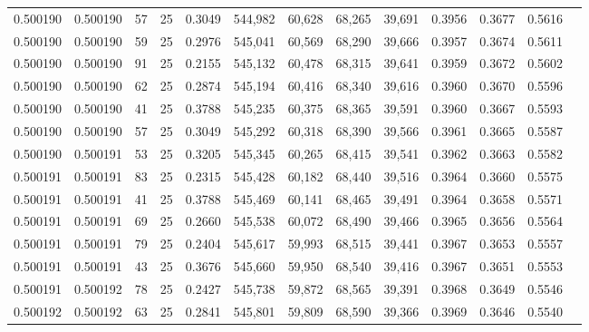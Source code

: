 \begin{tabular}{rrrrrrrrrrrrr}
0.500190 & 0.500190 &    57 &  25 &                                     0.3049 & 544,982 &  60,628 &  68,265 &  39,691 & 0.3956 & 0.3677 & 0.5616 \\
0.500190 & 0.500190 &    59 &  25 &                                     0.2976 & 545,041 &  60,569 &  68,290 &  39,666 & 0.3957 & 0.3674 & 0.5611 \\
0.500190 & 0.500190 &    91 &  25 &                                     0.2155 & 545,132 &  60,478 &  68,315 &  39,641 & 0.3959 & 0.3672 & 0.5602 \\
0.500190 & 0.500190 &    62 &  25 &                                     0.2874 & 545,194 &  60,416 &  68,340 &  39,616 & 0.3960 & 0.3670 & 0.5596 \\
0.500190 & 0.500190 &    41 &  25 &                                     0.3788 & 545,235 &  60,375 &  68,365 &  39,591 & 0.3960 & 0.3667 & 0.5593 \\
0.500190 & 0.500190 &    57 &  25 &                                     0.3049 & 545,292 &  60,318 &  68,390 &  39,566 & 0.3961 & 0.3665 & 0.5587 \\
0.500190 & 0.500191 &    53 &  25 &                                     0.3205 & 545,345 &  60,265 &  68,415 &  39,541 & 0.3962 & 0.3663 & 0.5582 \\
0.500191 & 0.500191 &    83 &  25 &                                     0.2315 & 545,428 &  60,182 &  68,440 &  39,516 & 0.3964 & 0.3660 & 0.5575 \\
0.500191 & 0.500191 &    41 &  25 &                                     0.3788 & 545,469 &  60,141 &  68,465 &  39,491 & 0.3964 & 0.3658 & 0.5571 \\
0.500191 & 0.500191 &    69 &  25 &                                     0.2660 & 545,538 &  60,072 &  68,490 &  39,466 & 0.3965 & 0.3656 & 0.5564 \\
0.500191 & 0.500191 &    79 &  25 &                                     0.2404 & 545,617 &  59,993 &  68,515 &  39,441 & 0.3967 & 0.3653 & 0.5557 \\
0.500191 & 0.500191 &    43 &  25 &                                     0.3676 & 545,660 &  59,950 &  68,540 &  39,416 & 0.3967 & 0.3651 & 0.5553 \\
0.500191 & 0.500192 &    78 &  25 &                                     0.2427 & 545,738 &  59,872 &  68,565 &  39,391 & 0.3968 & 0.3649 & 0.5546 \\
0.500192 & 0.500192 &    63 &  25 &                                     0.2841 & 545,801 &  59,809 &  68,590 &  39,366 & 0.3969 & 0.3646 & 0.5540 \\

\end{tabular}
